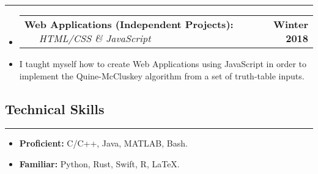 \documentclass[10pt,letterpaper]{article}
\makeatletter
\newcommand{\header}[2]
{
	\begin{tabular*}{\linewidth}{l @{\extracolsep{\fill}} r}
		\hspace{-27pt} #1 & #2 \\
	\end{tabular*}
}
\newcommand{\sectionbreak}
{
	\vspace{-1.2em}
	\rule{\textwidth}{1.7pt}
	\vspace{-1.7em}
}
\makeatother
\begin{document}
\hrule

\begin{itemize}
	\item[]
		\header
		{	
			\textbf{Web Applications (Independent Projects): }
			\href{https://aashpointo.github.io/KmapWebsite/}{\emph{\underline{\smash{aashpointo.github.io/KmapWebsite}}}} \ \ \ \footnotesize \emph{HTML/CSS \& JavaScript}
		}
		{\textbf{Winter 2018}}
	\item
		I taught myself how to create Web Applications using JavaScript in order to implement the Quine-McCluskey algorithm from a set of truth-table inputs.

\end{itemize}

\vspace{-1.5em}
\subsection*{Technical Skills}
\sectionbreak

\begin{itemize}

	\item
		\textbf{Proficient:} C/C++, Java, MATLAB, Bash.
	\item
		\textbf{Familiar:} Python, Rust, Swift, R, \LaTeX.
\end{itemize}
\end{document}
